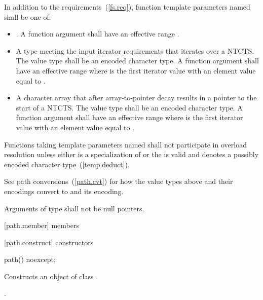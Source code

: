 \pnum
In addition to the requirements~(\ref{fs.req}),
function template parameters named 
shall be one of:
\begin{itemize}
\item {}. A function
  argument   shall have an
  effective range .
\item A type meeting the input iterator requirements that iterates over a NTCTS.
  The value type shall be an encoded character type. A function argument
    shall have an effective range
   where  is the first
  iterator value with an element value equal to
  .
\item A character array that after array-to-pointer decay results in a
  pointer to the start of a NTCTS. The value type shall be an encoded character type. A
  function argument   shall
  have an effective range  where
   is the first iterator value with an element value equal to
  .
\end{itemize}

\pnum
Functions taking template parameters named 
shall not participate in overload resolution unless either
 is a specialization of  or
the   is valid and
denotes a possibly  encoded character type~(\ref{temp.deduct}).

\pnum
\begin{note}
See path conversions~(\ref{path.cvt})
for how the value types above and their encodings convert to
 and its encoding.
\end{note}

\pnum
Arguments of type 
shall not be null pointers.

[path.member]{ members}

[path.construct]{ constructors}

\begin{itemdecl}
path() noexcept;
\end{itemdecl}

\begin{itemdescr}
\pnum
\effects Constructs an object of class .

\pnum
\postconditions {}.
\end{itemdescr}

